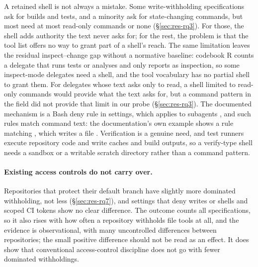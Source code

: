 A retained shell is not always a mistake. Some write-withholding specifications ask for builds and tests, and a
minority ask for state-changing commands, but most need at most read-only commands or none (\S\ref{sec:res-rq3}). For
those, the shell adds authority the text never asks for; for the rest, the problem is that the tool list offers no way
to grant part of a shell's reach. The same limitation leaves the residual inspect--change gap without a normative
baseline: codebook R counts a delegate that runs tests or analyses and only reports as inspection, so some inspect-mode
delegates need a shell, and the tool vocabulary has no partial shell to grant them. For delegates whose text asks only
to read, a shell limited to read-only commands would provide what the text asks for, but a command pattern in the
 field did not provide that limit in our probe (\S\ref{sec:res-rq3}). The documented mechanism is a Bash
deny rule in settings, which applies to subagents \citep{AnthropicSubagentsDoc}, and such rules match command text: the
documentation's own example shows a  rule matching , which writes a file
\citep{AnthropicPermissionsDoc}. Verification is a genuine need, and test runners execute repository code and write
caches and build outputs, so a verify-type shell needs a sandbox or a writable scratch directory rather than a command
pattern.

\paragraph{Existing access controls do not carry over.}
Repositories that protect their default branch have slightly more dominated withholding, not less
(\S\ref{sec:res-rq7}), and settings that deny writes or shells and scoped CI tokens show no clear difference. The
outcome counts all specifications, so it also rises with how often a repository withholds file tools at all, and the
evidence is observational, with many uncontrolled differences between repositories; the small positive difference
should not be read as an effect. It does show that conventional access-control discipline does not go with fewer
dominated withholdings.

